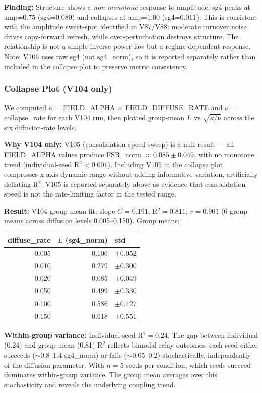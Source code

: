 \documentclass[11pt]{article}
\begin{document}
\textbf{Finding:} Structure shows a \emph{non-monotone} response to amplitude: sg4 peaks at amp=0.75 (sg4=0.080) and collapses at amp=1.00 (sg4=0.011). This is consistent with the amplitude sweet-spot identified in V87/V88: moderate turnover noise drives copy-forward refresh, while over-perturbation destroys structure. The relationship is not a simple inverse power law but a regime-dependent response. Note: V106 uses raw sg4 (not sg4\_norm), so it is reported separately rather than included in the collapse plot to preserve metric consistency.

\subsubsection{Collapse Plot (V104 only)}

We computed $\kappa$ = FIELD\_ALPHA $\times$ FIELD\_DIFFUSE\_RATE and $\nu$ = collapse\_rate for each V104 run, then plotted group-mean $L$ vs $\sqrt{\kappa/\nu}$ across the six diffusion-rate levels.

\textbf{Why V104 only:} V105 (consolidation speed sweep) is a null result --- all FIELD\_ALPHA values produce FSR\_norm $\approx 0.085 \pm 0.049$, with no monotone trend (individual-seed R$^2 < 0.001$). Including V105 in the collapse plot compresses x-axis dynamic range without adding informative variation, artificially deflating R$^2$. V105 is reported separately above as evidence that consolidation speed is not the rate-limiting factor in the tested range.

\textbf{Result:} V104 group-mean fit: slope $C = 0.191$, R$^2 = 0.811$, $r = 0.901$ (6 group means across diffusion levels 0.005--0.150). Group means:

\begin{center}
\begin{tabular}{rrl}
\toprule
diffuse\_rate & $L$ (sg4\_norm) & std \\
\midrule
0.005 & 0.106 & $\pm$0.052 \\
0.010 & 0.279 & $\pm$0.300 \\
0.020 & 0.085 & $\pm$0.049 \\
0.050 & 0.499 & $\pm$0.330 \\
0.100 & 0.586 & $\pm$0.427 \\
0.150 & 0.618 & $\pm$0.551 \\
\bottomrule
\end{tabular}
\end{center}

\textbf{Within-group variance:} Individual-seed R$^2 = 0.24$. The gap between individual (0.24) and group-mean (0.81) R$^2$ reflects bimodal relay outcomes: each seed either succeeds ($\sim$0.8--1.4 sg4\_norm) or fails ($\sim$0.05--0.2) stochastically, independently of the diffusion parameter. With $n=5$ seeds per condition, which seeds succeed dominates within-group variance. The group mean averages over this stochasticity and reveals the underlying coupling trend.
\end{document}
